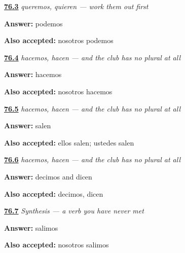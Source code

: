 \noindent\begin{minipage}[t]{\linewidth}
\raggedright
\hyperlink{review-ES-C13-plurales-cambio-derive}{\textbf{76.3}} \emph{queremos, quieren — work them out first}\par
\small \textbf{Answer:} podemos\par
\footnotesize \textbf{Also accepted:} nosotros podemos
\end{minipage}\par\medskip

\noindent\begin{minipage}[t]{\linewidth}
\raggedright
\hyperlink{review-ES-C13-plurales-yo-go-we}{\textbf{76.4}} \emph{hacemos, hacen — and the club has no plural at all}\par
\small \textbf{Answer:} hacemos\par
\footnotesize \textbf{Also accepted:} nosotros hacemos
\end{minipage}\par\medskip

\noindent\begin{minipage}[t]{\linewidth}
\raggedright
\hyperlink{review-ES-C13-plurales-yo-go-out}{\textbf{76.5}} \emph{hacemos, hacen — and the club has no plural at all}\par
\small \textbf{Answer:} salen\par
\footnotesize \textbf{Also accepted:} ellos salen; ustedes salen
\end{minipage}\par\medskip

\noindent\begin{minipage}[t]{\linewidth}
\raggedright
\hyperlink{review-ES-C13-plurales-yo-go-say}{\textbf{76.6}} \emph{hacemos, hacen — and the club has no plural at all}\par
\small \textbf{Answer:} decimos and dicen\par
\footnotesize \textbf{Also accepted:} decimos, dicen
\end{minipage}\par\medskip

\noindent\begin{minipage}[t]{\linewidth}
\raggedright
\hyperlink{review-ES-C13-sintesis-derivar-count}{\textbf{76.7}} \emph{Synthesis — a verb you have never met}\par
\small \textbf{Answer:} salimos\par
\footnotesize \textbf{Also accepted:} nosotros salimos
\end{minipage}\par\medskip

